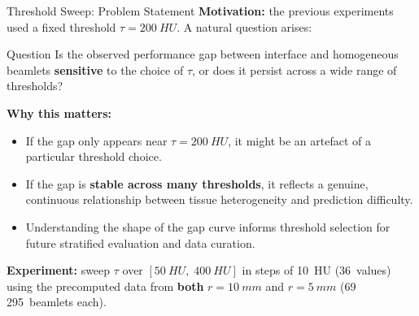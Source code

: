 \documentclass[aspectratio=169, 10pt]{beamer}
\begin{document}
\begin{frame}{Threshold Sweep: Problem Statement}
  \textbf{Motivation:} the previous experiments used a fixed threshold
  $\tau = \SI{200}{HU}$.  A natural question arises:

  \vspace{6pt}
  \begin{block}{Question}
    Is the observed performance gap between interface and homogeneous
    beamlets \textbf{sensitive} to the choice of $\tau$, or does it
    persist across a wide range of thresholds?
  \end{block}

  \vspace{6pt}
  \textbf{Why this matters:}
  \begin{itemize}
    \item If the gap only appears near $\tau = \SI{200}{HU}$, it might
          be an artefact of a particular threshold choice.
    \item If the gap is \textbf{stable across many thresholds}, it
          reflects a genuine, continuous relationship between tissue
          heterogeneity and prediction difficulty.
    \item Understanding the shape of the gap curve informs threshold
          selection for future stratified evaluation and data curation.
  \end{itemize}

  \vspace{6pt}
  \textbf{Experiment:} sweep $\tau$ over $[\SI{50}{HU},\;\SI{400}{HU}]$
  in steps of \SI{10}{HU} (36~values) using the precomputed data from
  \textbf{both} $r = \SI{10}{mm}$ and $r = \SI{5}{mm}$
  (69\,295~beamlets each).
\end{frame}
\end{document}
